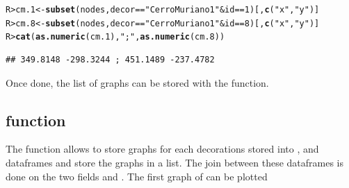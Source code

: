 \documentclass[article]{jss}\usepackage[]{graphicx}\usepackage[]{color}
\makeatletter
\newcommand{\hlnum}[1]{\textcolor[rgb]{0.686,0.059,0.569}{#1}}%
\newcommand{\hlstr}[1]{\textcolor[rgb]{0.192,0.494,0.8}{#1}}%
\newcommand{\hlopt}[1]{\textcolor[rgb]{0,0,0}{#1}}%
\newcommand{\hlstd}[1]{\textcolor[rgb]{0.345,0.345,0.345}{#1}}%
\newcommand{\hlkwb}[1]{\textcolor[rgb]{0.69,0.353,0.396}{#1}}%
\newcommand{\hlkwd}[1]{\textcolor[rgb]{0.737,0.353,0.396}{\textbf{#1}}}%
\newenvironment{kframe}{%
 \def\at@end@of@kframe{}%
 \ifinner\ifhmode%
  \def\at@end@of@kframe{\end{minipage}}%
  \begin{minipage}{\columnwidth}%
 \fi\fi%
 \def\FrameCommand##1{\hskip\@totalleftmargin \hskip-\fboxsep
 \colorbox{shadecolor}{##1}\hskip-\fboxsep
     \hskip-\linewidth \hskip-\@totalleftmargin \hskip\columnwidth}%
 \MakeFramed {\advance\hsize-\width
   \@totalleftmargin\z@ \linewidth\hsize
   \@setminipage}}%
 {\par\unskip\endMakeFramed%
 \at@end@of@kframe}
\newenvironment{knitrout}{}{} %
\makeatother
\begin{document}
\begin{knitrout}
\color{fgcolor}\begin{kframe}
\begin{alltt}
\hlstd{R> }\hlstd{cm.1} \hlkwb{<-} \hlkwd{subset}\hlstd{(nodes, decor} \hlopt{==} \hlstr{"Cerro Muriano 1"} \hlopt{&} \hlstd{id} \hlopt{==} \hlnum{1}\hlstd{)[,}\hlkwd{c}\hlstd{(}\hlstr{"x"}\hlstd{,}\hlstr{"y"}\hlstd{)]}
\hlstd{R> }\hlstd{cm.8} \hlkwb{<-} \hlkwd{subset}\hlstd{(nodes, decor} \hlopt{==} \hlstr{"Cerro Muriano 1"} \hlopt{&} \hlstd{id} \hlopt{==} \hlnum{8}\hlstd{)[,}\hlkwd{c}\hlstd{(}\hlstr{"x"}\hlstd{,}\hlstr{"y"}\hlstd{)]}
\hlstd{R> }\hlkwd{cat}\hlstd{(}\hlkwd{as.numeric}\hlstd{(cm.1),}\hlstr{";"}\hlstd{,}\hlkwd{as.numeric}\hlstd{(cm.8))}
\end{alltt}
\begin{verbatim}
## 349.8148 -298.3244 ; 451.1489 -237.4782
\end{verbatim}
\end{kframe}
\end{knitrout}

Once done, the list of graphs can be stored with the  function.

\subsection{ function} \label{sec:funlistdec}

The  function allows to store graphs for each decorations stored into ,  and  dataframes and store the graphs in a list. The join between these dataframes is done on the two fields  and . The first graph of can be plotted
\end{document}
